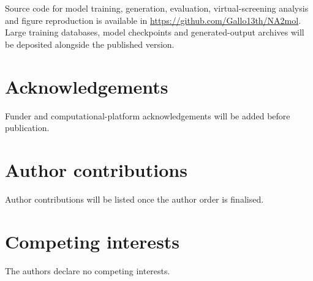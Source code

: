 \documentclass[pdflatex,sn-mathphys-num]{sn-jnl}
\theoremstyle{thmstyleone}
\theoremstyle{thmstyletwo}
\theoremstyle{thmstylethree}
\begin{document}
Source code for model training, generation, evaluation, virtual-screening analysis and figure reproduction is available in \url{https://github.com/Gallo13th/NA2mol}. Large training databases, model checkpoints and generated-output archives will be deposited alongside the published version.

\section*{Acknowledgements}

Funder and computational-platform acknowledgements will be added before publication.

\section*{Author contributions}

Author contributions will be listed once the author order is finalised.

\section*{Competing interests}

The authors declare no competing interests.




\newpage
\end{document}
